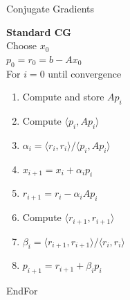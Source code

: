 \begin{frame}[fragile]{Conjugate Gradients}

 \begin{block}{}
  
   \begin{minipage}{0.45\textwidth}
      {\large \textbf{Standard CG}} \\
      
      Choose $x_0$ \\
      $p_0 = r_0 = b - Ax_0$ \\
      For $i=0$ until convergence
     \begin{enumerate}
      \item Compute and store $Ap_i$
      \item Compute $\langle p_i, Ap_i \rangle$
      \item $\alpha_i = \langle r_i, r_i \rangle / \langle p_i, Ap_i \rangle$
      \item $x_{i+1} = x_{i} + \alpha_i p_i$          
      \item $r_{i+1} = r_i - \alpha_i Ap_i$       
      \item Compute $\langle r_{i+1}, r_{i+1} \rangle$
      \item $\beta_i = \langle r_{i+1}, r_{i+1} \rangle / \langle r_i, r_i \rangle$
      \item $p_{i+1} = r_{i+1} + \beta_i p_i$
     \end{enumerate}
     EndFor
   \end{minipage}
   \begin{minipage}{0.53\textwidth}
   \end{minipage}
   
   \end{block}
   
\end{frame}


